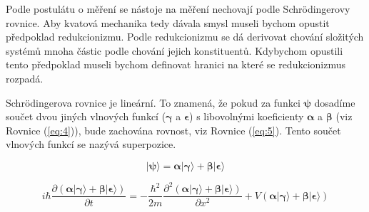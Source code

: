 Podle postulátu o měření se nástoje na měření nechovají podle Schrödingerovy rovnice. Aby kvatová mechanika tedy dávala smysl museli bychom opustit předpoklad redukcionizmu. Podle redukcionizmu se dá derivovat chování složitých systémů mnoha částic podle chování jejich konstituentů. Kdybychom opustili tento předpoklad museli bychom definovat hranici na které se redukcionizmus rozpadá.


Schrödingerova rovnice je lineární. To znamená, že pokud za funkci $\bm{\psi}$ dosadíme součet dvou jiných vlnových funkcí ($\bm{\gamma}$ a $\bm{\epsilon}$) s libovolnými koeficienty $\bm{\alpha}$ a $\bm{\beta}$ (viz Rovnice (\ref{eq:4})), bude zachována rovnost, viz Rovnice (\ref{eq:5}). Tento součet vlnových funkcí se nazývá superpozice.


\begin{equation}
    \bm{|\psi\rangle = \alpha|\gamma\rangle + \beta|\epsilon\rangle}
    \label{eq:4}
\end{equation}

\begin{equation}
    i\hbar \frac{\partial \bm{(\alpha|\gamma\rangle + \beta|\epsilon\rangle)}}{\partial t} = -\frac{\hbar^2}{2m}
    \frac{\partial^2 \bm{(\alpha|\gamma\rangle + \beta|\epsilon\rangle)}}{\partial x^2} + V \bm{(\alpha|\gamma\rangle + \beta|\epsilon\rangle)}
    \label{eq:5}
\end{equation}


